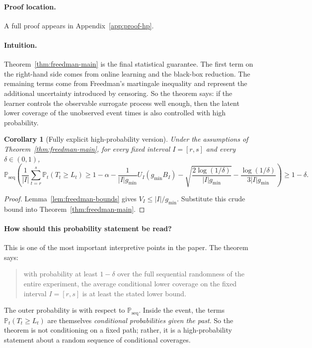 \documentclass[11pt]{article}
\newtheorem{corollary}{Corollary}
\newcommand{\Prob}{\mathbb{P}}
\newcommand{\1}{\mathbf{1}}
\newcommand{\seq}{\mathrm{seq}}
\begin{document}
\paragraph{Proof location.} A full proof appears in Appendix~\ref{app:proof-hp}.


\paragraph{Intuition.} Theorem~\ref{thm:freedman-main} is the final statistical guarantee. The first term on the right-hand side comes from online learning and the black-box reduction. The remaining terms come from Freedman's martingale inequality and represent the additional uncertainty introduced by censoring. So the theorem says: if the learner controls the observable surrogate process well enough, then the latent lower coverage of the unobserved event times is also controlled with high probability.



\begin{corollary}[Fully explicit high-probability version]
\label{cor:explicit-main}
Under the assumptions of Theorem~\ref{thm:freedman-main}, for every fixed interval $I=[r,s]$ and every $\delta\in(0,1)$,
\[
\Prob_{\seq}\!\left(
\frac{1}{|I|}\sum_{t=r}^s\Prob_t(T_t\ge L_t)
\ge
1-\alpha
-
\frac{1}{|I|g_{\min}}U_I(g_{\min}B_I)
-
\sqrt{\frac{2\log(1/\delta)}{|I|g_{\min}}}
-
\frac{\log(1/\delta)}{3|I|g_{\min}}
\right)
\ge 1-\delta.
\]
\end{corollary}

\begin{proof}
Lemma~\ref{lem:freedman-bounds} gives $V_I\le |I|/g_{\min}$. Substitute this crude bound into Theorem~\ref{thm:freedman-main}.
\end{proof}

\paragraph{How should this probability statement be read?}
This is one of the most important interpretive points in the paper. The theorem says:
\begin{quote}
with probability at least $1-\delta$ over the full sequential randomness of the entire experiment, the average conditional lower coverage on the fixed interval $I=[r,s]$ is at least the stated lower bound.
\end{quote}

The outer probability is with respect to $\Prob_{\seq}$. Inside the event, the terms $\Prob_t(T_t\ge L_t)$ are themselves \emph{conditional probabilities given the past}. So the theorem is not conditioning on a fixed path; rather, it is a high-probability statement about a random sequence of conditional coverages.
\end{document}
